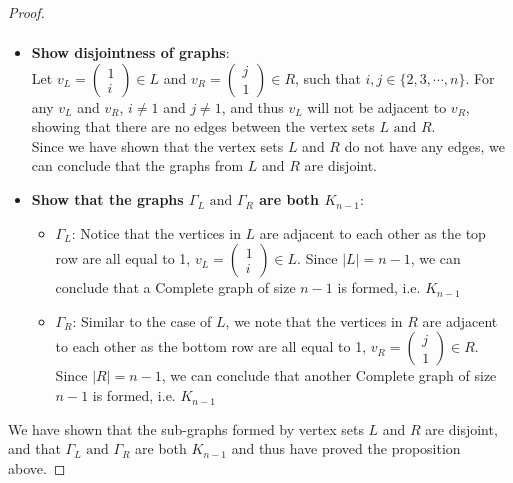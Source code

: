 \documentclass{article}
\begin{document}
\begin{proof}
\begin{align*}
    \end{align*}
    \begin{itemize}
        \item \textbf{Show disjointness of graphs}: \\
        Let \(v_L = \begin{pmatrix} 1 \\ i \end{pmatrix}\in L\) and \(v_R = \begin{pmatrix} j \\ 1 \end{pmatrix} \in R\), such that \(i, j \in \{2,3,\cdots,n\}\). For any \(v_L\) and \(v_R\), \(i \neq 1\) and \(j \neq 1\), and thus \(v_L\) will not be adjacent to \(v_R\), showing that there are no edges between the vertex sets \(L \text{ and } R\). \\
        Since we have shown that the vertex sets \(L\) and \(R\) do not have any edges, we can conclude that the graphs from \(L\) and \(R\) are disjoint.
        \item \textbf{Show that the graphs \(\Gamma_L \text{ and } \Gamma_R\) are both \(K_{n-1}\)}:
        \begin{itemize}
            \item \(\Gamma_L\): Notice that the vertices in \(L\) are adjacent to each other as the top row are all equal to 1, \(v_L = \begin{pmatrix} 1 \\ i \end{pmatrix}\in L\). Since \(|L| = n-1\), we can conclude that a Complete graph of size \(n-1\) is formed, i.e. \(K_{n-1}\)
            \item \(\Gamma_R\): Similar to the case of \(L\), we note that the vertices in \(R\) are adjacent to each other as the bottom row are all equal to 1, \(v_R = \begin{pmatrix} j \\ 1 \end{pmatrix} \in R\). Since \(|R| = n-1\), we can conclude that another Complete graph of size \(n-1\) is formed, i.e. \(K_{n-1}\)
        \end{itemize}
    \end{itemize}
     We have shown that the sub-graphs formed by vertex sets \(L\) and \(R\) are disjoint, and that \(\Gamma_L \text{ and } \Gamma_R\) are both \(K_{n-1}\) and thus have proved the proposition above.
\end{proof}
\end{document}
